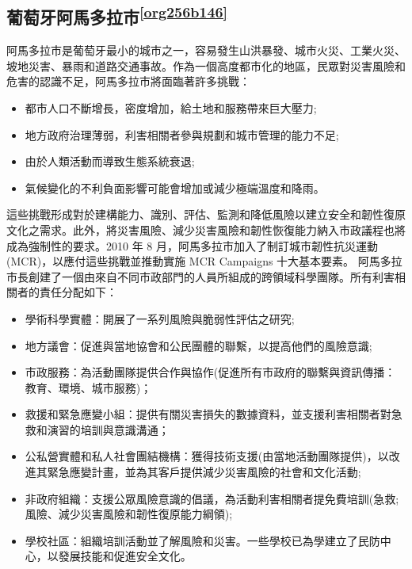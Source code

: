 \documentclass[a4paper,12pt]{article}
\begin{document}
\subsection{葡萄牙阿馬多拉市\textsuperscript{\ref{org256b146}}}
\label{sec:org7c9de35}
阿馬多拉市是葡萄牙最小的城市之一，容易發生山洪暴發、城市火災、工業火災、坡地災害、暴雨和道路交通事故。作為一個高度都市化的地區，民眾對災害風險和危害的認識不足，阿馬多拉市將面臨著許多挑戰：\\
\begin{itemize}
\item 都市人口不斷增長，密度增加，給土地和服務帶來巨大壓力;\\
\item 地方政府治理薄弱，利害相關者參與規劃和城市管理的能力不足;\\
\item 由於人類活動而導致生態系統衰退;\\
\item 氣候變化的不利負面影響可能會增加或減少極端溫度和降雨。\\
\end{itemize}
這些挑戰形成對於建構能力、識別、評估、監測和降低風險以建立安全和韌性復原文化之需求。此外，將災害風險、減少災害風險和韌性恢復能力納入市政議程也將成為強制性的要求。2010 年 8 月，阿馬多拉市加入了制訂城市韌性抗災運動(MCR)，以應付這些挑戰並推動實施 MCR Campaigns 十大基本要素。 阿馬多拉市長創建了一個由來自不同市政部門的人員所組成的跨領域科學團隊。所有利害相關者的責任分配如下：\\
\begin{itemize}
\item 學術科學實體：開展了一系列風險與脆弱性評估之研究;\\
\item 地方議會：促進與當地協會和公民團體的聯繫，以提高他們的風險意識;\\
\item 市政服務：為活動團隊提供合作與協作(促進所有市政府的聯繫與資訊傳播：教育、環境、城市服務)；\\
\item 救援和緊急應變小組：提供有關災害損失的數據資料，並支援利害相關者對急救和演習的培訓與意識溝通；\\
\item 公私營實體和私人社會團結機構：獲得技術支援(由當地活動團隊提供)，以改進其緊急應變計畫，並為其客戶提供減少災害風險的社會和文化活動;\\
\item 非政府組織：支援公眾風險意識的倡議，為活動利害相關者提免費培訓(急救;風險、減少災害風險和韌性復原能力綱領);\\
\item 學校社區：組織培訓活動並了解風險和災害。一些學校已為學建立了民防中心，以發展技能和促進安全文化。\\
\end{itemize}
\end{document}
